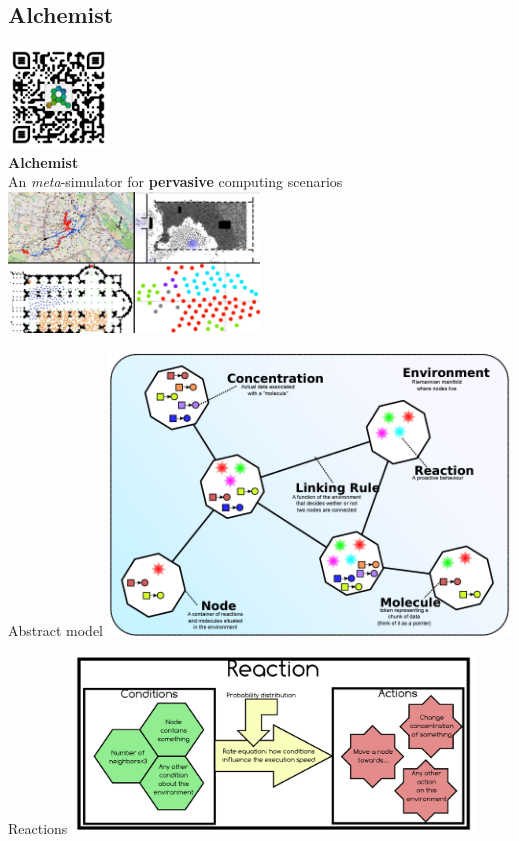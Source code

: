 \documentclass[presentation, 9pt]{beamer}\mode<presentation>{\usetheme{AMSBolognaFC}}
\begin{document}
\subsection{Alchemist}
\begin{frame}[c, plain]
\begin{center}
	\includegraphics[width=0.2\textwidth]{img/qr-code.png}\\
	\Huge \textbf{Alchemist}\\
	{\large An  \emph{meta}-simulator for \textbf{pervasive} computing scenarios}\\[0.3cm]
	\includegraphics[width=0.5\textwidth]{img/alchemist-recap.png}
\end{center}
\end{frame}
\begin{frame}{Abstract model}
\centering
\includegraphics[width=0.8\textwidth]{img/abstract-model.png}
\end{frame}
\begin{frame}{Reactions}
\centering
\includegraphics[width=0.8\textwidth]{img/reaction-model.png}
\end{frame}
\end{document}
